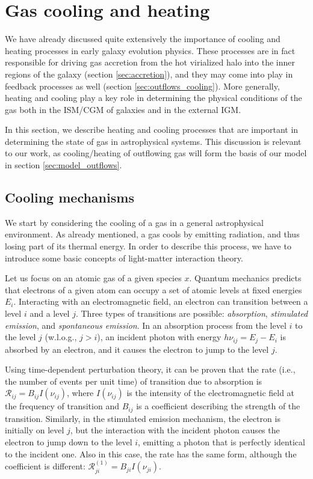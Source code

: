 \section{Gas cooling and heating}\label{sec:gas_cooling_heating}


We have already discussed quite extensively the importance of cooling and heating processes in early galaxy evolution physics. These processes are in fact responsible for driving gas accretion from the hot virialized halo into the inner regions of the galaxy (section \ref{sec:accretion}), and they may come into play in feedback processes as well (section \ref{sec:outflows_cooling}). More generally, heating and cooling play a key role in determining the physical conditions of the gas both in the ISM/CGM of galaxies and in the external IGM. 

In this section, we describe heating and cooling processes that are important in determining the state of gas in astrophysical systems. This discussion is relevant to our work, as cooling/heating of outflowing gas will form the basis of our model in section \ref{sec:model_outflows}. 

\subsection{Cooling mechanisms}\label{sec:cooling}

We start by considering the cooling of a gas in a general astrophysical environment. As already mentioned, a gas cools by emitting radiation, and thus losing part of its thermal energy. In order to describe this process, we have to introduce some basic concepts of light-matter interaction theory.

Let us focus on an atomic gas of a given species $x$. Quantum mechanics predicts that electrons of a given atom can occupy a set of atomic levels at fixed energies ${E_i}$. Interacting with an electromagnetic field, an electron can transition between a level $i$ and a level $j$. Three types of transitions are possible: \textit{absorption}, \textit{stimulated emission}, and \textit{spontaneous emission}. In an absorption process from the level $i$ to the level $j$ (w.l.o.g., $j>i$), an incident photon with energy $h\nu_{ij}=E_j-E_i$ is absorbed by an electron, and it causes the electron to jump to the level $j$. 

Using time-dependent perturbation theory, it can be proven that the rate (i.e., the number of events per unit time) of transition due to absorption is $\mathcal{R}_{ij} = B_{ij} I(\nu_{ij})$, where $I(\nu_{ij})$ is the intensity of the electromagnetic field at the frequency of transition and $B_{ij}$ is a coefficient describing the strength of the transition. Similarly, in the stimulated emission mechanism, the electron is initially on level $j$, but the interaction with the incident photon causes the electron to jump down to the level $i$, emitting a photon that is perfectly identical to the incident one. Also in this case, the rate has the same form, although the coefficient is different: $\mathcal{R}_{ji}^{(1)} = B_{ji} I(\nu_{ji})$. 

